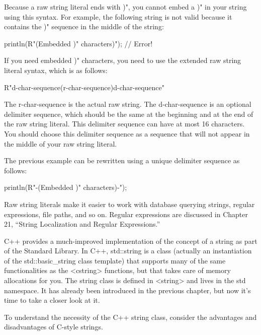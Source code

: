Because a raw string literal ends with )", you cannot embed a )" in your string using this syntax. For example, the following string is not valid because it contains the )" sequence in the middle of the string:

\begin{cpp}
println(R"(Embedded )" characters)"); // Error!
\end{cpp}

If you need embedded )" characters, you need to use the extended raw string literal syntax, which is as follows:

\begin{cpp}
R"d-char-sequence(r-char-sequence)d-char-sequence"
\end{cpp}

The r-char-sequence is the actual raw string. The d-char-sequence is an optional delimiter sequence, which should be the same at the beginning and at the end of the raw string literal. This delimiter sequence can have at most 16 characters. You should choose this delimiter sequence as a sequence that will not appear in the middle of your raw string literal.

The previous example can be rewritten using a unique delimiter sequence as follows:

\begin{cpp}
println(R"-(Embedded )" characters)-");
\end{cpp}

Raw string literals make it easier to work with database querying strings, regular expressions, file paths, and so on. Regular expressions are discussed in Chapter 21, “String Localization and Regular Expressions.”


C++ provides a much-improved implementation of the concept of a string as part of the Standard Library. In C++, std::string is a class (actually an instantiation of the std::basic\_string class template) that supports many of the same functionalities as the <cstring> functions, but that takes care of memory allocations for you. The string class is defined in <string> and lives in the std namespace. It has already been introduced in the previous chapter, but now it’s time to take a closer look at it.


To understand the necessity of the C++ string class, consider the advantages and disadvantages of C-style strings.


